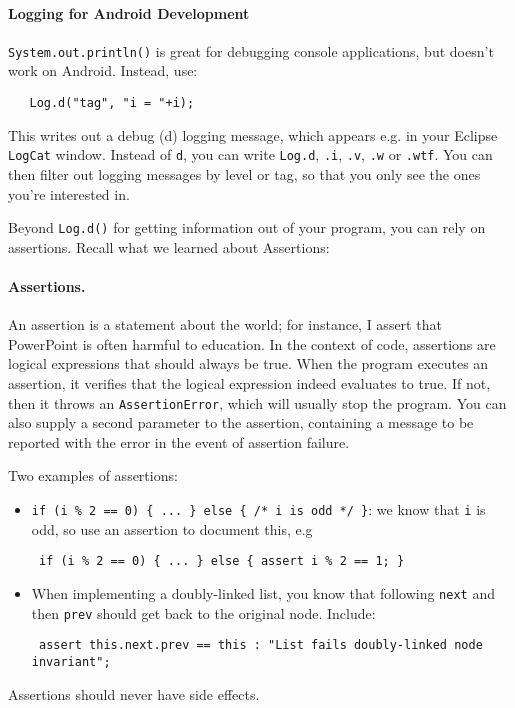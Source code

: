 \paragraph{Logging for Android Development}
\vspace*{-1em}
{\tt System.out.println()} is great
for debugging console applications, but doesn't work on Android. Instead, use:

{\tt ~~~Log.d("tag", "i = "+i); }

This writes out a debug (d) logging message, which appears e.g. in your Eclipse
{\tt LogCat} window. Instead of {\tt d}, you can write {\tt Log.d},
{\tt .i}, {\tt .v}, {\tt .w} or {\tt .wtf}. You can then filter out logging messages
by level or tag, so that you only see the ones you're interested in.

Beyond {\tt Log.d()} for getting information out of your program,
you can rely on assertions. Recall what we learned about Assertions:


\paragraph{Assertions.} An assertion is a statement about the world;
for instance, I assert that PowerPoint is often harmful to education.
In the context of code, assertions are logical expressions that should
always be true. When the program executes an assertion, it verifies
that the logical expression indeed evaluates to true.  If not, then it
throws an {\tt AssertionError}, which will usually stop the
program. You can also supply a second parameter to the assertion,
containing a message to be reported with the error in the event of
assertion failure.

Two examples of assertions: 
\begin{itemize} 
\item \verb+if (i % 2 == 0) { ... } else { /* i is odd */ }+:
we know that {\tt i} is odd, so use an assertion to document this, e.g

\verb+ if (i % 2 == 0) { ... } else { assert i % 2 == 1; }+
\item When implementing a doubly-linked list, you know that following
{\tt next} and then {\tt prev} should get back to the original node.
Include:

\verb+ assert this.next.prev == this : "List fails doubly-linked node invariant";+
\end{itemize}

Assertions should never have side effects.

